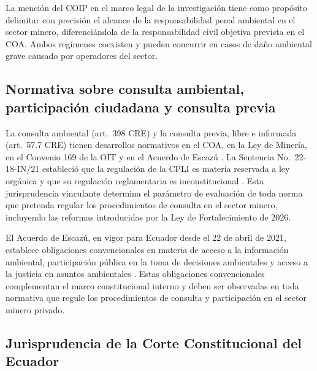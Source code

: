 La mención del COIP en el marco legal de la investigación tiene como propósito delimitar con precisión el alcance de la responsabilidad penal ambiental en el sector minero, diferenciándola de la responsabilidad civil objetiva prevista en el COA. Ambos regímenes coexisten y pueden concurrir en casos de daño ambiental grave causado por operadores del sector.

\subsection{Normativa sobre consulta ambiental, participación ciudadana y consulta previa}

La consulta ambiental (art.\ 398 CRE) y la consulta previa, libre e informada (art.\ 57.7 CRE) tienen desarrollos normativos en el COA, en la Ley de Minería, en el Convenio 169 de la OIT y en el Acuerdo de Escazú \parencite{cre_2008,coa_2017,acuerdo_escazu_2018}. La Sentencia No.\ 22-18-IN/21 estableció que la regulación de la CPLI es materia reservada a ley orgánica y que su regulación reglamentaria es inconstitucional \parencite{cce_22_18_in_21}. Esta jurisprudencia vinculante determina el parámetro de evaluación de toda norma que pretenda regular los procedimientos de consulta en el sector minero, incluyendo las reformas introducidas por la Ley de Fortalecimiento de 2026.

El Acuerdo de Escazú, en vigor para Ecuador desde el 22 de abril de 2021, establece obligaciones convencionales en materia de acceso a la información ambiental, participación pública en la toma de decisiones ambientales y acceso a la justicia en asuntos ambientales \parencite{acuerdo_escazu_2018}. Estas obligaciones convencionales complementan el marco constitucional interno y deben ser observadas en toda normativa que regule los procedimientos de consulta y participación en el sector minero privado.

\subsection{Jurisprudencia de la Corte Constitucional del Ecuador}

